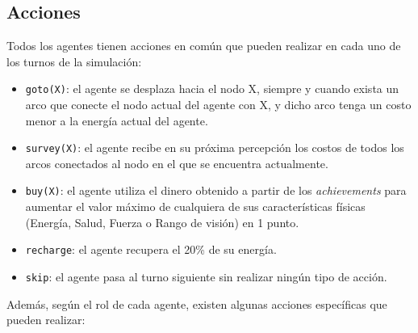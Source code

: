 \subsection{Acciones}

Todos los agentes tienen acciones en común que pueden realizar en cada uno de los turnos de la simulación:

\begin{itemize}
	\item \texttt{goto(X)}: el agente se desplaza hacia el nodo X, siempre y cuando exista un arco que conecte el nodo actual del agente con X, y dicho arco tenga un costo menor a la energía actual del agente.
	\item \texttt{survey(X)}: el agente recibe en su próxima percepción los costos de todos los arcos conectados al nodo en el que se encuentra actualmente.
	\item \texttt{buy(X)}: el agente utiliza el dinero obtenido a partir de los \textit{achievements} para aumentar el valor máximo de cualquiera de sus características físicas (Energía, Salud, Fuerza o Rango de visión) en 1 punto.
	\item \texttt{recharge}: el agente recupera el 20\% de su energía.
	\item \texttt{skip}: el agente pasa al turno siguiente sin realizar ningún tipo de acción.
\end{itemize}

Además, según el rol de cada agente, existen algunas acciones específicas que pueden realizar:

